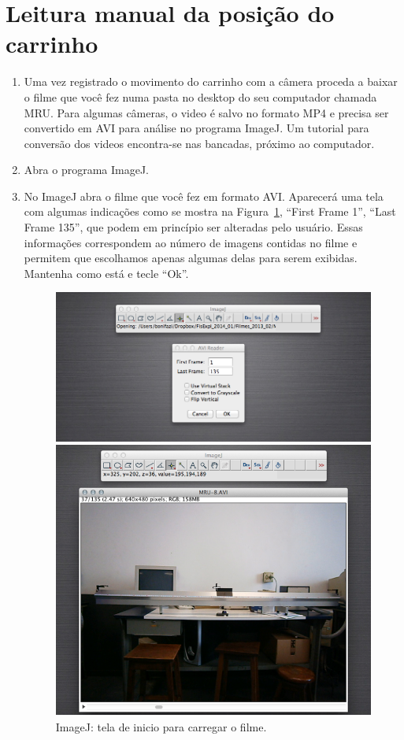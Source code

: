 \section*{Leitura manual da posição do carrinho}
\begin{enumerate}

\item Uma vez registrado o movimento do carrinho com a câmera proceda a baixar o filme que você fez numa pasta no desktop do seu computador chamada MRU. Para algumas câmeras, o video é salvo no formato MP4 e precisa ser convertido em AVI para análise no programa ImageJ. Um tutorial para conversão dos videos encontra-se nas bancadas, próximo ao computador.
\item Abra o programa ImageJ.
\item No ImageJ abra o filme que você fez em formato AVI. Aparecerá uma tela com algumas indicações como se mostra na Figura~\ref{fig:frame}, “First Frame 1”, “Last Frame 135”, que podem em princípio ser alteradas pelo usuário. Essas informações correspondem ao número de imagens contidas no filme e permitem que escolhamos apenas algumas delas para serem exibidas. Mantenha como está e tecle “Ok”.
\begin{figure}[t!]
\begin{center}
\includegraphics[width=11cm]{fig/frame}
\caption{\label{fig:frame} ImageJ: tela de inicio para carregar o filme.}
\vspace{0.3cm}
\includegraphics[width=11cm]{fig/cursor}

\end{center}
\end{figure}
\end{enumerate}
